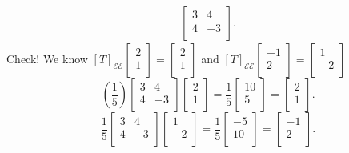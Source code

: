 \documentclass{report}
\begin{document}
{\begin{align*}
\begin{bmatrix}
  3 & 4\\
  4 & -3\\
  \end{bmatrix}
.\end{align*}
Check!  We know $ \left[ T \right] _{ \mathcal{E} \mathcal{E}} \begin{bmatrix}
2\\
1\\
\end{bmatrix}
= \begin{bmatrix}
2\\
1\\
\end{bmatrix}
$ and $ \left[ T \right] _{ \mathcal{E} \mathcal{E}} \begin{bmatrix}
-1\\
2\\
\end{bmatrix}
= \begin{bmatrix}
1\\
-2\\
\end{bmatrix}
$ 
\[
\left( \frac{1}{5} \right) \begin{bmatrix}
3 & 4\\
4 & -3\\
\end{bmatrix}\begin{bmatrix}
2\\
1\\
\end{bmatrix}
= \frac{1}{5} \begin{bmatrix}
10\\
5\\
\end{bmatrix}
= \begin{bmatrix}
2\\
1\\
\end{bmatrix}
.\] 
 \[
 \frac{1}{5} \begin{bmatrix}
 3 & 4\\
 4 & -3\\
 \end{bmatrix} \begin{bmatrix}
 1\\
 -2\\
 \end{bmatrix}
  = \frac{1}{5} \begin{bmatrix}
  -5\\
  10\\
  \end{bmatrix}
  = \begin{bmatrix}
  -1\\
  2\\
  \end{bmatrix}
 .\] 
  }
\end{document}
